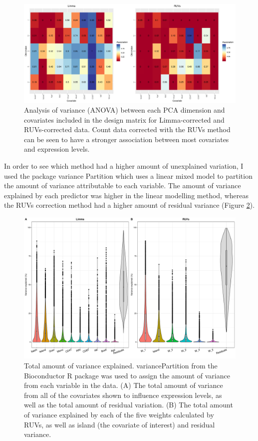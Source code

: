 \documentclass[12pt,a4paper,titlepage,twoside,openright]{book}
\begin{document}
\begin{mainmatter}
{{\begin{figure}[htb!]
\centering
\includegraphics[width=\textwidth,height=\textheight,keepaspectratio]{Figures/Heatmap_SigCovar_RUVvsLM_OnlyCovarInLM.pdf}
\caption{Analysis of variance (ANOVA) between each PCA dimension and covariates included in the design matrix for Limma-corrected and RUVs-corrected data. Count data corrected with the RUVs method can be seen to have a stronger association between most covariates and expression levels.}
\label{fig:RUV vs Limma: Heatmap of Covariates}
\end{figure}

In order to see which method had a higher amount of unexplained variation, I used the package variance Partition \cite{hoffman2016variancepartition} which uses a linear mixed model to partition the amount of variance attributable to each variable. The amount of variance explained by each predictor was higher in the linear modelling method, whereas the RUVs correction method had a higher amount of residual variance (﻿Figure \ref{fig:Variance Explained}).

\begin{figure}[htb!]
\centering
\includegraphics[width=\textwidth,height=\textheight,keepaspectratio]{Figures/VarianceExplained_LMvsRUVs.pdf}
\caption{Total amount of variance explained. variancePartition from the Bioconductor R package was used to assign the amount of variance from each variable in the data. (A) The total amount of variance from all of the covariates shown to influence expression levels, as well as the total amount of residual variation. (B) The total amount of variance explained by each of the five weights calculated by RUVs, as well as island (the covariate of interest) and residual variance.}
\label{fig:Variance Explained}
\end{figure}

}}
\end{mainmatter}
\end{document}
